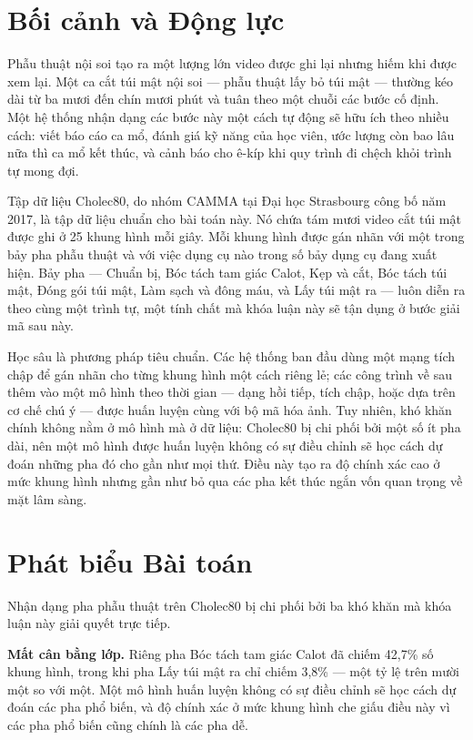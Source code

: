\documentclass[11pt,a4paper]{report}
\begin{document}
\section{Bối cảnh và Động lực}

Phẫu thuật nội soi tạo ra một lượng lớn video được ghi lại nhưng hiếm khi được xem lại. Một ca cắt túi mật nội soi --- phẫu thuật lấy bỏ túi mật --- thường kéo dài từ ba mươi đến chín mươi phút và tuân theo một chuỗi các bước cố định. Một hệ thống nhận dạng các bước này một cách tự động sẽ hữu ích theo nhiều cách: viết báo cáo ca mổ, đánh giá kỹ năng của học viên, ước lượng còn bao lâu nữa thì ca mổ kết thúc, và cảnh báo cho ê-kíp khi quy trình đi chệch khỏi trình tự mong đợi.

Tập dữ liệu Cholec80, do nhóm CAMMA tại Đại học Strasbourg công bố năm 2017, là tập dữ liệu chuẩn cho bài toán này. Nó chứa tám mươi video cắt túi mật được ghi ở 25 khung hình mỗi giây. Mỗi khung hình được gán nhãn với một trong bảy pha phẫu thuật và với việc dụng cụ nào trong số bảy dụng cụ đang xuất hiện. Bảy pha --- Chuẩn bị, Bóc tách tam giác Calot, Kẹp và cắt, Bóc tách túi mật, Đóng gói túi mật, Làm sạch và đông máu, và Lấy túi mật ra --- luôn diễn ra theo cùng một trình tự, một tính chất mà khóa luận này sẽ tận dụng ở bước giải mã sau này.

Học sâu là phương pháp tiêu chuẩn. Các hệ thống ban đầu dùng một mạng tích chập để gán nhãn cho từng khung hình một cách riêng lẻ; các công trình về sau thêm vào một mô hình theo thời gian --- dạng hồi tiếp, tích chập, hoặc dựa trên cơ chế chú ý --- được huấn luyện cùng với bộ mã hóa ảnh. Tuy nhiên, khó khăn chính không nằm ở mô hình mà ở dữ liệu: Cholec80 bị chi phối bởi một số ít pha dài, nên một mô hình được huấn luyện không có sự điều chỉnh sẽ học cách dự đoán những pha đó cho gần như mọi thứ. Điều này tạo ra độ chính xác cao ở mức khung hình nhưng gần như bỏ qua các pha kết thúc ngắn vốn quan trọng về mặt lâm sàng.

\section{Phát biểu Bài toán}

Nhận dạng pha phẫu thuật trên Cholec80 bị chi phối bởi ba khó khăn mà khóa luận này giải quyết trực tiếp.

\textbf{Mất cân bằng lớp.} Riêng pha Bóc tách tam giác Calot đã chiếm 42,7\% số khung hình, trong khi pha Lấy túi mật ra chỉ chiếm 3,8\% --- một tỷ lệ trên mười một so với một. Một mô hình huấn luyện không có sự điều chỉnh sẽ học cách dự đoán các pha phổ biến, và độ chính xác ở mức khung hình che giấu điều này vì các pha phổ biến cũng chính là các pha dễ.
\end{document}
